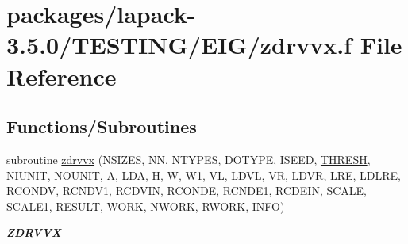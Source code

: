 \hypertarget{zdrvvx_8f}{}\section{packages/lapack-\/3.5.0/\+T\+E\+S\+T\+I\+N\+G/\+E\+I\+G/zdrvvx.f File Reference}
\label{zdrvvx_8f}
\subsection*{Functions/\+Subroutines}
\begin{DoxyCompactItemize}
\item 
subroutine \hyperlink{group__complex16__eig_gad219aa578f2f410c3431c8d3642c28cb}{zdrvvx} (N\+S\+I\+Z\+E\+S, N\+N, N\+T\+Y\+P\+E\+S, D\+O\+T\+Y\+P\+E, I\+S\+E\+E\+D, \hyperlink{zlaqgs_8c_a0656018abfc9fa2821827415f5d5ea57}{T\+H\+R\+E\+S\+H}, N\+I\+U\+N\+I\+T, N\+O\+U\+N\+I\+T, \hyperlink{classA}{A}, \hyperlink{example__user_8c_ae946da542ce0db94dced19b2ecefd1aa}{L\+D\+A}, H, W, W1, V\+L, L\+D\+V\+L, V\+R, L\+D\+V\+R, L\+R\+E, L\+D\+L\+R\+E, R\+C\+O\+N\+D\+V, R\+C\+N\+D\+V1, R\+C\+D\+V\+I\+N, R\+C\+O\+N\+D\+E, R\+C\+N\+D\+E1, R\+C\+D\+E\+I\+N, S\+C\+A\+L\+E, S\+C\+A\+L\+E1, R\+E\+S\+U\+L\+T, W\+O\+R\+K, N\+W\+O\+R\+K, R\+W\+O\+R\+K, I\+N\+F\+O)
\begin{DoxyCompactList}\small\item\em {\bfseries Z\+D\+R\+V\+V\+X} \end{DoxyCompactList}\end{DoxyCompactItemize}
